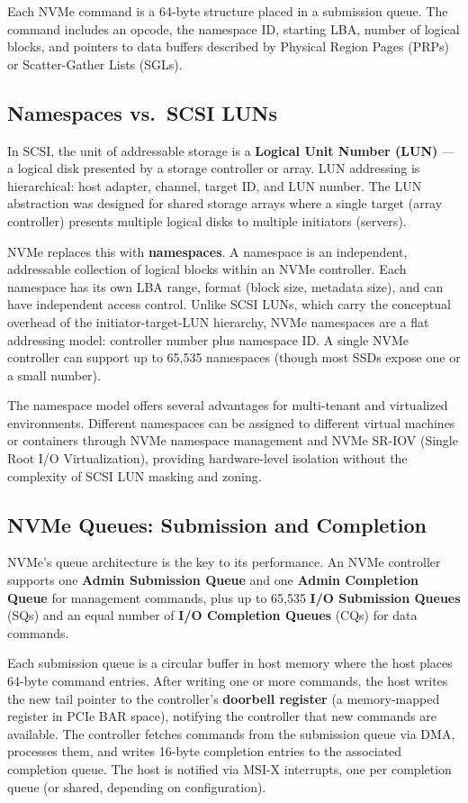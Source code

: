 Each NVMe command is a 64-byte structure placed in a submission queue. The command includes an opcode, the namespace ID, starting LBA, number of logical blocks, and pointers to data buffers described by Physical Region Pages (PRPs) or Scatter-Gather Lists (SGLs).

\subsection{Namespaces vs.\ SCSI LUNs}

In SCSI, the unit of addressable storage is a \textbf{Logical Unit Number (LUN)} --- a logical disk presented by a storage controller or array. LUN addressing is hierarchical: host adapter, channel, target ID, and LUN number. The LUN abstraction was designed for shared storage arrays where a single target (array controller) presents multiple logical disks to multiple initiators (servers).

NVMe replaces this with \textbf{namespaces}. A namespace is an independent, addressable collection of logical blocks within an NVMe controller. Each namespace has its own LBA range, format (block size, metadata size), and can have independent access control. Unlike SCSI LUNs, which carry the conceptual overhead of the initiator-target-LUN hierarchy, NVMe namespaces are a flat addressing model: controller number plus namespace ID. A single NVMe controller can support up to 65,535 namespaces (though most SSDs expose one or a small number).

The namespace model offers several advantages for multi-tenant and virtualized environments. Different namespaces can be assigned to different virtual machines or containers through NVMe namespace management and NVMe SR-IOV (Single Root I/O Virtualization), providing hardware-level isolation without the complexity of SCSI LUN masking and zoning.

\subsection{NVMe Queues: Submission and Completion}

NVMe's queue architecture is the key to its performance. An NVMe controller supports one \textbf{Admin Submission Queue} and one \textbf{Admin Completion Queue} for management commands, plus up to 65,535 \textbf{I/O Submission Queues} (SQs) and an equal number of \textbf{I/O Completion Queues} (CQs) for data commands.

Each submission queue is a circular buffer in host memory where the host places 64-byte command entries. After writing one or more commands, the host writes the new tail pointer to the controller's \textbf{doorbell register} (a memory-mapped register in PCIe BAR space), notifying the controller that new commands are available. The controller fetches commands from the submission queue via DMA, processes them, and writes 16-byte completion entries to the associated completion queue. The host is notified via MSI-X interrupts, one per completion queue (or shared, depending on configuration).

